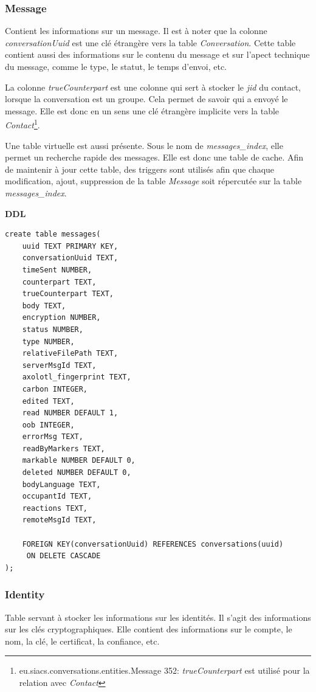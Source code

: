 \documentclass[a4paper,11pt]{article}
\begin{document}
\subsubsection{Message}

Contient les informations sur un message. Il est à noter que la colonne \textit{conversationUuid} est une clé étrangère vers la table \textit{Conversation}. Cette table contient aussi des informations sur le contenu du message et sur l'apect technique du message, comme le type, le statut, le temps d'envoi, etc.

La colonne \textit{trueCounterpart} est une colonne qui sert à stocker le \textit{jid} du contact, lorsque la conversation est un groupe. Cela permet de savoir qui a envoyé le message. Elle est donc en un sens une clé étrangère implicite vers la table \textit{Contact}\footnote{eu.siacs.conversations.entities.Message 352: \textit{trueCounterpart} est utilisé pour la relation avec \textit{Contact}}.

Une table virtuelle est aussi présente. Sous le nom de \textit{messages\_index}, elle permet un recherche rapide des messages. Elle est donc une table de cache. Afin de maintenir à jour cette table, des triggers sont utilisés afin que chaque modification, ajout, suppression de la table \textit{Message} soit répercutée sur la table \textit{messages\_index}.

\textbf{DDL}
\begin{lstlisting}
create table messages(
    uuid TEXT PRIMARY KEY,
    conversationUuid TEXT,
    timeSent NUMBER,
    counterpart TEXT,
    trueCounterpart TEXT,
    body TEXT,
    encryption NUMBER,
    status NUMBER,
    type NUMBER,
    relativeFilePath TEXT,
    serverMsgId TEXT,
    axolotl_fingerprint TEXT,
    carbon INTEGER,
    edited TEXT,
    read NUMBER DEFAULT 1,
    oob INTEGER,
    errorMsg TEXT,
    readByMarkers TEXT,
    markable NUMBER DEFAULT 0,
    deleted NUMBER DEFAULT 0,
    bodyLanguage TEXT,
    occupantId TEXT,
    reactions TEXT,
    remoteMsgId TEXT, 
    
    FOREIGN KEY(conversationUuid) REFERENCES conversations(uuid) 
     ON DELETE CASCADE
);
\end{lstlisting}
\subsubsection{Identity}

Table servant à stocker les informations sur les identités. Il s'agit des informations sur les clés cryptographiques. Elle contient des informations sur le compte, le nom, la clé, le certificat, la confiance, etc.
\end{document}

